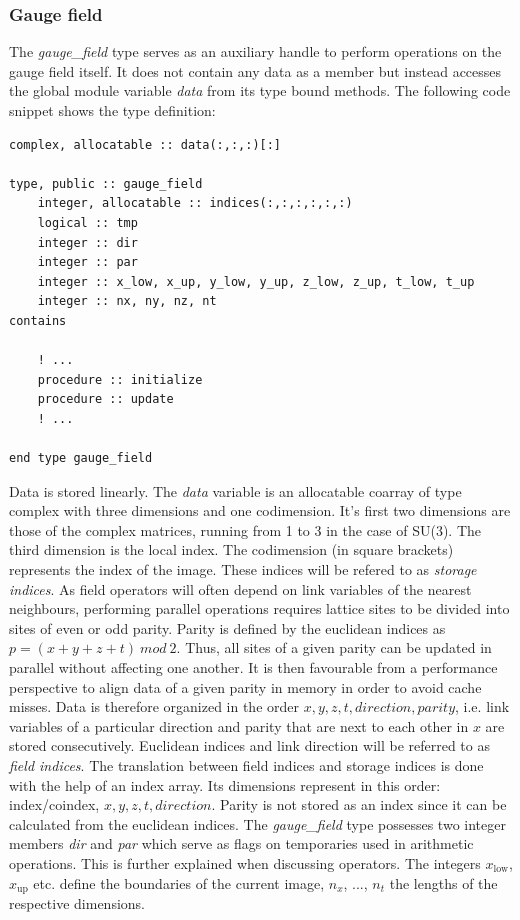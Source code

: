 \documentclass[graybox]{svmult}
\begin{document}
\subsubsection*{Gauge field}
The \emph{gauge\_field} type serves as an auxiliary handle to perform operations on the gauge field itself. It does not contain any data as a member but instead accesses the global module variable \emph{data} from its type bound methods. The following code snippet shows the type definition:
\begin{lstlisting}[caption={Type definition of the \emph{gauge\_field} type}]
complex, allocatable :: data(:,:,:)[:]

type, public :: gauge_field
    integer, allocatable :: indices(:,:,:,:,:,:)
    logical :: tmp
    integer :: dir
    integer :: par
    integer :: x_low, x_up, y_low, y_up, z_low, z_up, t_low, t_up
    integer :: nx, ny, nz, nt
contains
    
    ! ...
    procedure :: initialize
    procedure :: update
    ! ...
    
end type gauge_field
\end{lstlisting}
Data is stored linearly. The \emph{data} variable is an allocatable coarray of type complex with three dimensions and one codimension. It's first two dimensions are those of the complex matrices, running from 1 to 3 in the case of SU(3). The third dimension is the local index. The codimension (in square brackets) represents the index of the image. These indices will be refered to as \emph{storage indices}. As field operators will often depend on link variables of the nearest neighbours, performing parallel operations requires lattice sites to be divided into sites of even or odd parity. Parity is defined by the euclidean indices as $p = (x+y+z+t)\ mod\ 2$. Thus, all sites of a given parity can be updated in parallel without affecting one another. It is then favourable from a performance perspective to align data of a given parity in memory in order to avoid cache misses. Data is therefore organized in the order $x, y, z, t, direction, parity$, i.e. link variables of a particular direction and parity that are next to each other in $x$ are stored consecutively. Euclidean indices and link direction will be referred to as \emph{field indices}. The translation between field indices and storage indices is done with the help of an index array. Its dimensions represent in this order: index/coindex, $x, y, z, t, direction$. Parity is not stored as an index since it can be calculated from the euclidean indices.
The \emph{gauge\_field} type possesses two integer members \emph{dir} and \emph{par} which serve as flags on temporaries used in arithmetic operations. This is further explained when discussing operators. The integers $x_{\text{low}}$, $x_{\text{up}}$ etc. define the boundaries of the current image, $n_x$, ..., $n_t$ the lengths of the respective dimensions.
\end{document}

